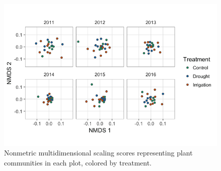 \documentclass[fleqn,10pt,lineno]{wlpeerj} %
\begin{document}
\begin{figure}[!ht]
  \centering
      \includegraphics[width=5in]{../figures/sppcomp_bray_all.png}
  \caption{Nonmetric multidimensional scaling scores representing plant communities in each plot, colored by treatment. }
\end{figure}

\newpage{}



\end{document}
